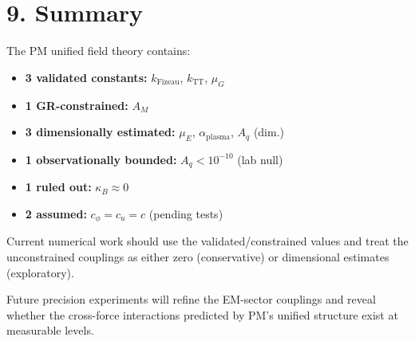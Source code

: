 \documentclass{article}
\begin{document}
\section*{9. Summary}

The PM unified field theory contains:

\begin{itemize}
    \item \textbf{3 validated constants:} $k_{\text{Fizeau}}$, $k_{\text{TT}}$, $\mu_G$
    \item \textbf{1 GR-constrained:} $A_M$
    \item \textbf{3 dimensionally estimated:} $\mu_E$, $\alpha_{\text{plasma}}$, $A_q$ (dim.)
    \item \textbf{1 observationally bounded:} $A_q < 10^{-10}$ (lab null)
    \item \textbf{1 ruled out:} $\kappa_B \approx 0$
    \item \textbf{2 assumed:} $c_\phi = c_u = c$ (pending tests)
\end{itemize}

Current numerical work should use the validated/constrained values and treat the
unconstrained couplings as either zero (conservative) or dimensional estimates
(exploratory).

Future precision experiments will refine the EM-sector couplings and reveal
whether the cross-force interactions predicted by PM's unified structure exist
at measurable levels.
\end{document}
